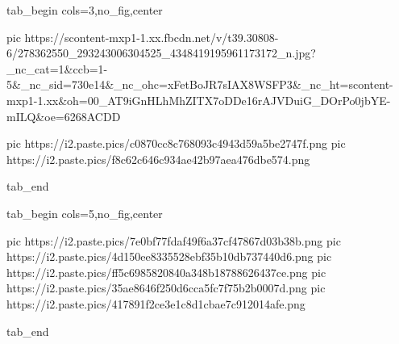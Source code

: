  
 
 
 
 

\ifcmt
  tab_begin cols=3,no_fig,center

     pic https://scontent-mxp1-1.xx.fbcdn.net/v/t39.30808-6/278362550_293243006304525_4348419195961173172_n.jpg?_nc_cat=1&ccb=1-5&_nc_sid=730e14&_nc_ohc=xFetBoJR7sIAX8WSFP3&_nc_ht=scontent-mxp1-1.xx&oh=00_AT9iGnHLhMhZITX7oDDe16rAJVDuiG_DOrPo0jbYE-mILQ&oe=6268ACDD

		 pic https://i2.paste.pics/c0870cc8c768093c4943d59a5be2747f.png
		 pic https://i2.paste.pics/f8c62c646c934ae42b97aea476dbe574.png

  tab_end
\fi

\ifcmt
  tab_begin cols=5,no_fig,center

		 pic https://i2.paste.pics/7e0bf77fdaf49f6a37cf47867d03b38b.png
		 pic https://i2.paste.pics/4d150ee8335528ebf35b10db737440d6.png
		 pic https://i2.paste.pics/ff5c6985820840a348b18788626437ce.png
		 pic https://i2.paste.pics/35ae8646f250d6cca5fc7f75b2b0007d.png
		 pic https://i2.paste.pics/417891f2ce3e1c8d1cbae7c912014afe.png

  tab_end
\fi

